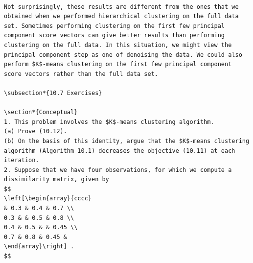 \documentclass[10pt]{article}
\begin{document}
\begin{verbatim}

Not surprisingly, these results are different from the ones that we obtained when we performed hierarchical clustering on the full data set. Sometimes performing clustering on the first few principal component score vectors can give better results than performing clustering on the full data. In this situation, we might view the principal component step as one of denoising the data. We could also perform $K$-means clustering on the first few principal component score vectors rather than the full data set.

\subsection*{10.7 Exercises}

\section*{Conceptual}
1. This problem involves the $K$-means clustering algorithm.
(a) Prove (10.12).
(b) On the basis of this identity, argue that the $K$-means clustering algorithm (Algorithm 10.1) decreases the objective (10.11) at each iteration.
2. Suppose that we have four observations, for which we compute a dissimilarity matrix, given by
$$
\left[\begin{array}{cccc} 
& 0.3 & 0.4 & 0.7 \\
0.3 & & 0.5 & 0.8 \\
0.4 & 0.5 & & 0.45 \\
0.7 & 0.8 & 0.45 &
\end{array}\right] .
$$


\end{verbatim}
\end{document}
